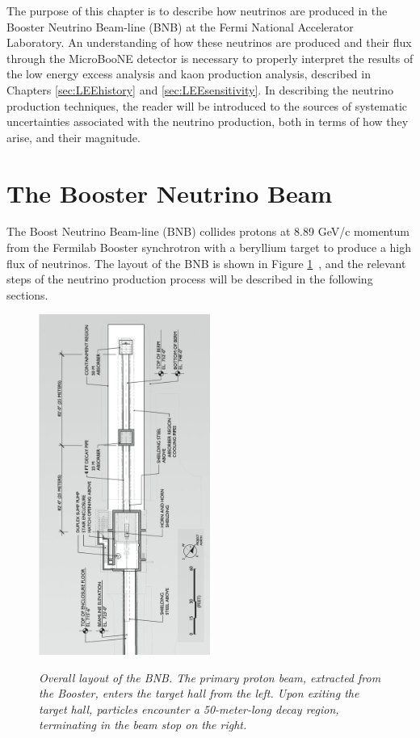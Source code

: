 The purpose of this chapter is to describe how neutrinos are produced in the Booster Neutrino Beam-line (BNB) at the Fermi National Accelerator Laboratory. An understanding of how these neutrinos are produced and their flux through the MicroBooNE detector is necessary to properly interpret the results of the low energy excess analysis and kaon production analysis, described in Chapters \ref{sec:LEEhistory} and \ref{sec:LEEsensitivity}. In describing the neutrino production techniques, the reader will be introduced to the sources of systematic uncertainties associated with the neutrino production, both in terms of how they arise, and their magnitude. 

\section{The Booster Neutrino Beam}\label{beam_descript_section}
The Boost Neutrino Beam-line (BNB) collides protons at 8.89 GeV/c momentum from the Fermilab Booster synchrotron with a beryllium target to produce a high flux of neutrinos. The layout of the BNB is shown in Figure \ref{BNB_layout_schematic}~\cite{MBFluxPaper}, and the relevant steps of the neutrino production process will be described in the following sections.

\begin{figure}[ht!]
\centering
	\includegraphics[width=0.5\textwidth]{Figures/BNB_layout_schematic.png} \\
\caption{\textit{Overall layout of the BNB. The primary proton beam, extracted from the Booster, enters the target hall from the left. Upon exiting the target hall, particles encounter a 50-meter-long decay region, terminating in the beam stop on the right.}}\label{BNB_layout_schematic}
\end{figure}

